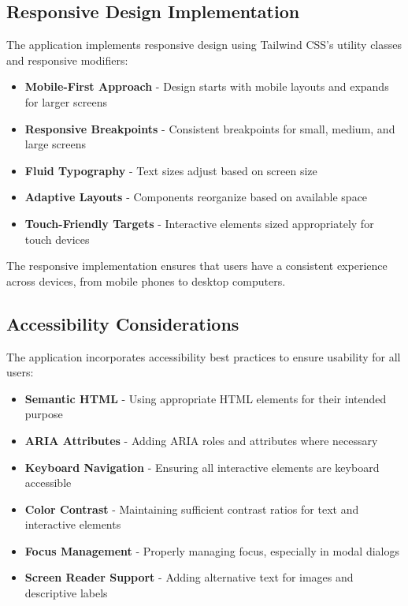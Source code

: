 \subsection{Responsive Design Implementation}

The application implements responsive design using Tailwind CSS's utility classes and responsive modifiers:

\begin{itemize}
  \item \textbf{Mobile-First Approach} - Design starts with mobile layouts and expands for larger screens
  \item \textbf{Responsive Breakpoints} - Consistent breakpoints for small, medium, and large screens
  \item \textbf{Fluid Typography} - Text sizes adjust based on screen size
  \item \textbf{Adaptive Layouts} - Components reorganize based on available space
  \item \textbf{Touch-Friendly Targets} - Interactive elements sized appropriately for touch devices
\end{itemize}

The responsive implementation ensures that users have a consistent experience across devices, from mobile phones to desktop computers.

\subsection{Accessibility Considerations}

The application incorporates accessibility best practices to ensure usability for all users:

\begin{itemize}
  \item \textbf{Semantic HTML} - Using appropriate HTML elements for their intended purpose
  \item \textbf{ARIA Attributes} - Adding ARIA roles and attributes where necessary
  \item \textbf{Keyboard Navigation} - Ensuring all interactive elements are keyboard accessible
  \item \textbf{Color Contrast} - Maintaining sufficient contrast ratios for text and interactive elements
  \item \textbf{Focus Management} - Properly managing focus, especially in modal dialogs
  \item \textbf{Screen Reader Support} - Adding alternative text for images and descriptive labels
\end{itemize}

